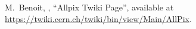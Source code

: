   M.~Benoit, \etal, ``Allpix Twiki Page'',
  available at \url{https://twiki.cern.ch/twiki/bin/view/Main/AllPix}.
